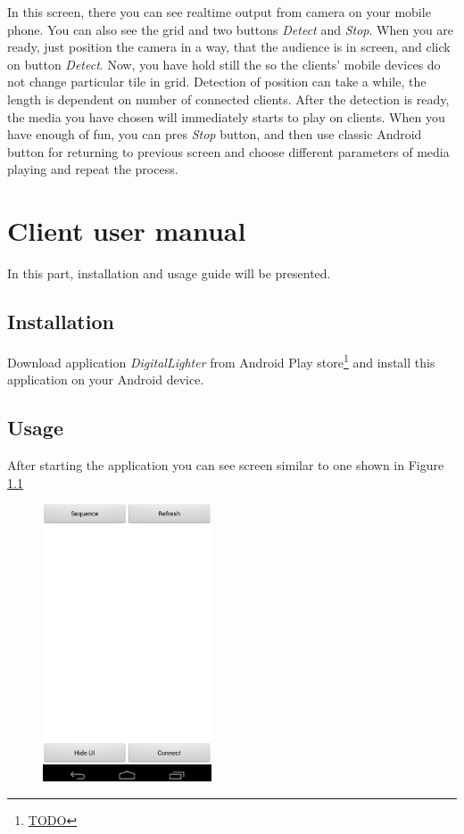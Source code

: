 In this screen, there you can see realtime output from camera on your mobile phone.
You can also see the grid and two buttons \emph{Detect} and \emph{Stop}.
When you are ready, just position the camera in a way, that the audience is in screen, and click on button \emph{Detect}.
Now, you have hold still the so the clients' mobile devices do not change particular tile in grid.
Detection of position can take a while, the length is dependent on number of connected clients.
After the detection is ready, the media you have chosen will immediately starts to play on clients.
When you have enough of fun, you can pres \emph{Stop} button, and then use classic Android button for returning to previous screen and choose different parameters of media playing and repeat the process.

\chapter{Client user manual}
In this part, installation and usage guide will be presented.
\section{Installation}
Download application \emph{DigitalLighter} from Android Play store\footnote{\url{TODO}} and install this application on your Android device.
\section{Usage}
After starting the application you can see screen similar to one shown in Figure \ref{fig:manual_client}

\begin{figure}[h]
	\centering
		\includegraphics[width=5cm]{appendix/client1.png}
	\caption{}
	\label{fig:manual_client}
\end{figure}

